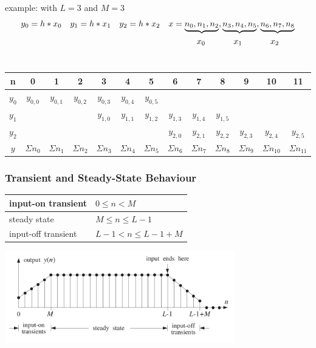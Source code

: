 example: with $L=3$ and $M=3$
\begin{align}
& y_0=h\ast x_0 && y_1=h\ast x_1 && y_2=h\ast x_2 && x={\underbrace{n_0,n_1,n_2},\underbrace{n_3,n_4,n_5},\underbrace{n_6,n_7,n_8}}\notag \\
& && && && \qquad\quad \ x_0 \qquad\quad \ x_1 \qquad\quad \ x_2 \notag
\end{align}\\

\begin{tabular}{c|cccccccccccc}  
	n & 0 & 1 & 2 & 3 & 4 & 5 & 6 & 7 & 8 & 9 & 10 & 11\\
	\hline
	$y_0$ & $y_{0,0}$ & $y_{0,1}$ & $y_{0,2}$ & $y_{0,3}$ & $y_{0,4}$ & $y_{0,5}$ &
	& & & & &\\
	$y_1$ & & & & $y_{1,0}$ & $y_{1,1}$ & $y_{1,2}$ & $y_{1,3}$ & $y_{1,4}$ &
	$y_{1,5}$ & & & \\
	$y_2$ & & & & & & & $y_{2,0}$ & $y_{2,1}$ & $y_{2,2}$ & $y_{2,3}$ & $y_{2,4}$ & $y_{2,5}$
	\\
	\hline
	$y$ & $\Sigma n_{0}$ & $\Sigma n_{1}$&$\Sigma n_{2}$ & $\Sigma n_{3}$&$\Sigma n_{4}$ &$\Sigma n_{5}$ &$\Sigma n_{6}$  &$\Sigma n_{7}$  & $\Sigma n_{8}$ & $\Sigma n_{9}$ & $\Sigma n_{10}$ & $\Sigma n_{11}$
	\\
\end{tabular}


\subsubsection{Transient and Steady-State Behaviour}
\begin{multicols}{2}
	\begin{tabular}{|l|l|}
		\hline
		input-on transient	& $ 0 \leq n < M $
		\\ \hline
		steady state			& $ M \leq n \leq L-1 $
		\\ \hline
		input-off transient		& $ L-1 < n \leq L-1+M $
		\\ \hline
	\end{tabular}

\columnbreak

  \includegraphics[width=10cm]{./picture/transient_steady_state}
\end{multicols}

